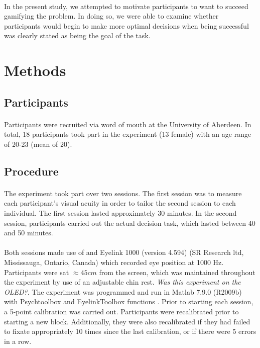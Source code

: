 \documentclass[12pt]{article}
\begin{document}
\paragraph{} In the present study, we attempted to motivate participants to want to succeed gamifying the problem. In doing so, we were able to examine whether participants would begin to make more optimal decisions when being successful was clearly stated as being the goal of the task. 

\section*{Methods}

\subsection*{Participants}
\paragraph{} Participants were recruited via word of mouth at the University of Aberdeen. In total, 18 participants took part in the experiment (13 female) with an age range of 20-23 (mean of 20). 

\subsection*{Procedure}
\paragraph{} The experiment took part over two sessions. The first session was to measure each participant's visual acuity in order to tailor the second session to each individual. The first session lasted approximately 30 minutes. In the second session, participants carried out the actual decision task, which lasted between 40 and 50 minutes. 

\paragraph{} Both sessions made use of and Eyelink 1000 (version 4.594) (SR Research ltd, Mississauga, Ontario, Canada) which recorded eye position at 1000 Hz. Participants were sat $\approx45cm$ from the screen, which was maintained throughout the experiment by use of an adjustable chin rest. \textit{Was this experiment on the OLED?}. The experiment was programmed and run in Matlab 7.9.0 (R2009b) with Psychtoolbox \citep{pelli1997videotoolbox} and EyelinkToolbox functions \citep{cornelissen2002eyelink}. Prior to starting each session, a 5-point calibration was carried out. Participants were recalibrated prior to starting a new block. Additionally, they were also recalibrated if they had failed to fixate appropriately 10 times since the last calibration, or if there were 5 errors in a row.
\end{document}
